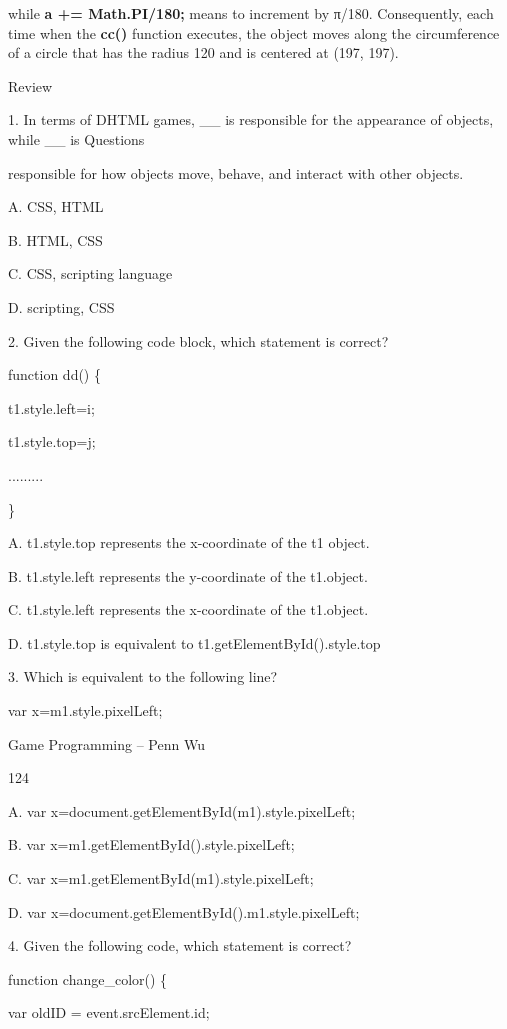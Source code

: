 \documentclass[
]{article}
\begin{document}
while \textbf{a += Math.PI/180;} means to increment by π/180.
Consequently, each time when the \textbf{cc()} function executes, the
object moves along the circumference of a circle that has the radius 120
and is centered at (197, 197).

Review

1. In terms of DHTML games, \_\_ is responsible for the appearance of
objects, while \_\_ is Questions

responsible for how objects move, behave, and interact with other
objects.

A. CSS, HTML

B. HTML, CSS

C. CSS, scripting language

D. scripting, CSS

2. Given the following code block, which statement is correct?

function dd() \{

t1.style.left=i;

t1.style.top=j;

.........

\}

A. t1.style.top represents the x-coordinate of the t1 object.

B. t1.style.left represents the y-coordinate of the t1.object.

C. t1.style.left represents the x-coordinate of the t1.object.

D. t1.style.top is equivalent to t1.getElementById().style.top

3. Which is equivalent to the following line?

var x=m1.style.pixelLeft;

Game Programming -- Penn Wu

124

\protect\hypertarget{index_split_008.htmlux5cux23p125}{}{}

A. var
x=document.getElementById(\textquotesingle m1\textquotesingle).style.pixelLeft;

B. var x=m1.getElementById().style.pixelLeft;

C. var
x=m1.getElementById(\textquotesingle m1\textquotesingle).style.pixelLeft;

D. var x=document.getElementById().m1.style.pixelLeft;

4. Given the following code, which statement is correct?

function change\_color() \{

var oldID = event.srcElement.id;
\end{document}
